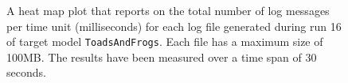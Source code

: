 \begin{figure}[htbp]
\centering
\begin{minipage}{1\textwidth}
  \centering
\end{minipage}
\caption{A heat map plot that reports on the total number of log messages per time unit (milliseconds) for each log file generated during run 16 of target model \texttt{ToadsAndFrogs}. Each file has a maximum size of 100MB. The results have been measured over a time span of 30 seconds.}
\label{figure:throughput_sum_toadsandfrogs_16}
\end{figure}